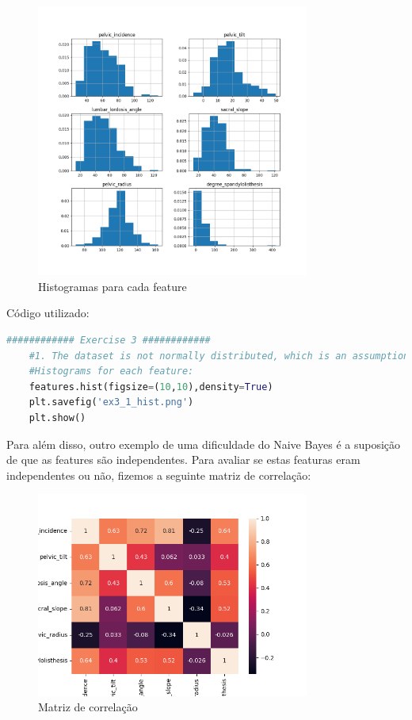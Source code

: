 \documentclass[a4paper,12pt]{article} %
\begin{document}
\begin{enumerate}
\begin{figure}[H]
    \centering
    \includegraphics[width=0.8\textwidth]{ex3_1_hist.png}
    \caption{Histogramas para cada feature}
    \label{fig:ex3_histograms}
\end{figure}


Código utilizado:

\begin{lstlisting}[language=Python]
    ############ Exercise 3 ############
    #1. The dataset is not normally distributed, which is an assumption of the Naive Bayes classifier.
    #Histograms for each feature:
    features.hist(figsize=(10,10),density=True)
    plt.savefig('ex3_1_hist.png')
    plt.show()
\end{lstlisting}

Para além disso, outro exemplo de uma dificuldade do Naive Bayes é a suposição de que as features são independentes. Para avaliar 
se estas featuras eram independentes ou não, fizemos a seguinte matriz de correlação:

\begin{figure}[H]
    \centering
    \includegraphics[width=0.8\textwidth]{ex3_3_coormatrix.png}
    \caption{Matriz de correlação}
    \label{fig:ex3_corr}
\end{figure}


\end{enumerate}
\end{document}
